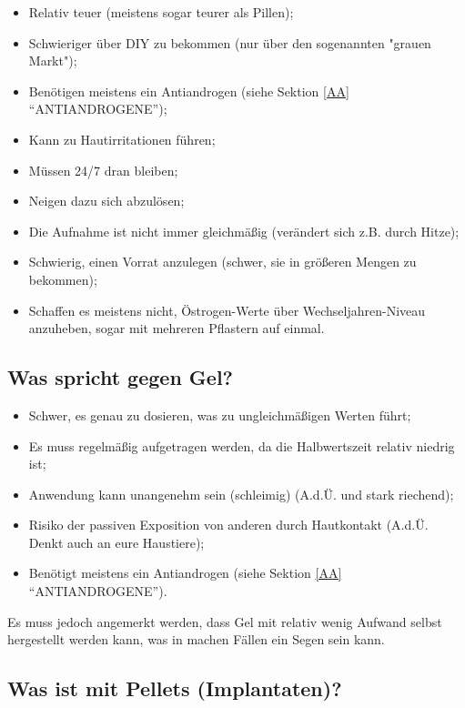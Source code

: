 \documentclass{article}
\begin{document}
\begin{itemize}
  \item Relativ teuer (meistens sogar teurer als Pillen);
  \item Schwieriger über DIY zu bekommen (nur über den sogenannten "grauen Markt");
  \item Benötigen meistens ein Antiandrogen (siehe Sektion \ref{AA} “ANTIANDROGENE”);
  \item Kann zu Hautirritationen führen;
  \item Müssen 24/7 dran bleiben;
  \item Neigen dazu sich abzulösen;
  \item Die Aufnahme ist nicht immer gleichmäßig (verändert sich z.B. durch Hitze);
  \item Schwierig, einen Vorrat anzulegen (schwer, sie in größeren Mengen zu bekommen);
  \item Schaffen es meistens nicht, Östrogen-Werte über Wechseljahren-Niveau anzuheben, sogar mit mehreren Pflastern auf einmal.
\end{itemize}

\subsection{Was spricht gegen Gel?}

\begin{itemize}
  \item Schwer, es genau zu dosieren, was zu ungleichmäßigen Werten führt;
  \item Es muss regelmäßig aufgetragen werden, da die Halbwertszeit relativ niedrig ist;
  \item Anwendung kann unangenehm sein (schleimig) (A.d.Ü. und stark riechend);
  \item Risiko der passiven Exposition von anderen durch Hautkontakt (A.d.Ü. Denkt auch an eure Haustiere);
  \item Benötigt meistens ein Antiandrogen (siehe Sektion \ref{AA} “ANTIANDROGENE”).
\end{itemize}

Es muss jedoch angemerkt werden, dass Gel mit relativ wenig Aufwand selbst hergestellt werden kann, was in machen Fällen ein Segen sein kann.

\subsection{Was ist mit Pellets (Implantaten)?}
\end{document}
